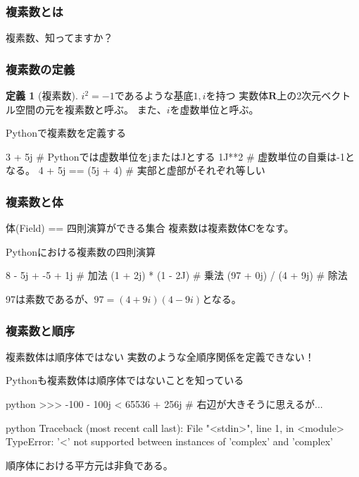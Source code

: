\documentclass[dvipdfmx,11pt,notheorems]{beamer}
\theoremstyle{definition}
\newtheorem{definition}{定義}
\begin{document}
\begin{frame}\frametitle{複素数とは}

\begin{center}
\Huge{複素数、知ってますか？}
\end{center}

\end{frame}

\begin{frame}[fragile]\frametitle{複素数の定義}

\begin{definition}[複素数]
$i^{2}=-1$であるような基底$1, i$を持つ
実数体$\mathbf{R}$上の2次元ベクトル空間の元を複素数と呼ぶ。
また、$i$を虚数単位と呼ぶ。
\end{definition}

\begin{exampleblock}{Pythonで複素数を定義する}
\begin{pyconsole}
3 + 5j # Pythonでは虚数単位をjまたはJとする
1J**2 # 虚数単位の自乗は-1となる。
4 + 5j == (5j + 4) # 実部と虚部がそれぞれ等しい
\end{pyconsole}
\end{exampleblock}

\end{frame}

\begin{frame}[fragile]\frametitle{複素数と体}

\begin{block}{体(Field) == 四則演算ができる集合}
複素数は複素数体$\mathbf{C}$をなす。
\end{block}

\begin{exampleblock}{Pythonにおける複素数の四則演算}
\begin{pyconsole}
8 - 5j + -5 + 1j # 加法
(1 + 2j) * (1 - 2J) # 乗法
(97 + 0j) / (4 + 9j) # 除法
\end{pyconsole}
\end{exampleblock}
97は素数であるが、$97 = (4 +9i)(4-9i)$となる。
\end{frame}

\begin{frame}[fragile]\frametitle{複素数と順序}
\begin{block}{複素数体は順序体ではない}
実数のような全順序関係を定義できない！
\end{block}

\begin{exampleblock}{Pythonも複素数体は順序体ではないことを知っている}
\begin{pygments}{python}
>>> -100 - 100j < 65536 + 256j # 右辺が大きそうに思えるが...
\end{pygments}
\begin{pygments}{python}
Traceback (most recent call last):
  File "<stdin>", line 1, in <module>
TypeError: '<' not supported between 
instances of 'complex' and 'complex'
\end{pygments}
\end{exampleblock}
順序体における平方元は非負である。
\end{frame}
\end{document}

